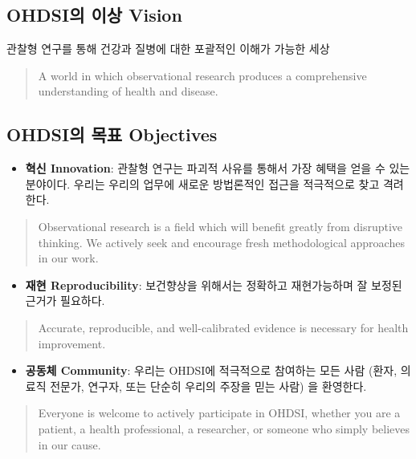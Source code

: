 \documentclass[11pt]{book}
\providecommand{\tightlist}{%
  \setlength{\itemsep}{0pt}\setlength{\parskip}{0pt}}
\theoremstyle{definition}
\theoremstyle{definition}
\theoremstyle{definition}
\theoremstyle{remark}
\begin{document}
\subsection{OHDSI의 이상 Vision}\label{ohdsi--vision}

관찰형 연구를 통해 건강과 질병에 대한 포괄적인 이해가 가능한 세상

\begin{quote}
A world in which observational research produces a comprehensive
understanding of health and disease. 
\end{quote}

\subsection{OHDSI의 목표 Objectives}\label{ohdsi--objectives}

\begin{itemize}
\tightlist
\item
  \textbf{혁신 Innovation}: 관찰형 연구는 파괴적 사유를 통해서 가장
  혜택을 얻을 수 있는 분야이다. 우리는 우리의 업무에 새로운 방법론적인
  접근을 적극적으로 찾고 격려한다.
\end{itemize}

\begin{quote}
Observational research is a field which will benefit greatly from
disruptive thinking. We actively seek and encourage fresh methodological
approaches in our work.
\end{quote}

\begin{itemize}
\tightlist
\item
  \textbf{재현 Reproducibility}: 보건향상을 위해서는 정확하고
  재현가능하며 잘 보정된 근거가 필요하다.
\end{itemize}

\begin{quote}
Accurate, reproducible, and well-calibrated evidence is necessary for
health improvement.
\end{quote}

\begin{itemize}
\tightlist
\item
  \textbf{공동체 Community}: 우리는 OHDSI에 적극적으로 참여하는 모든
  사람 (환자, 의료직 전문가, 연구자, 또는 단순히 우리의 주장을 믿는
  사람) 을 환영한다.
\end{itemize}

\begin{quote}
Everyone is welcome to actively participate in OHDSI, whether you are a
patient, a health professional, a researcher, or someone who simply
believes in our cause.
\end{quote}
\end{document}
